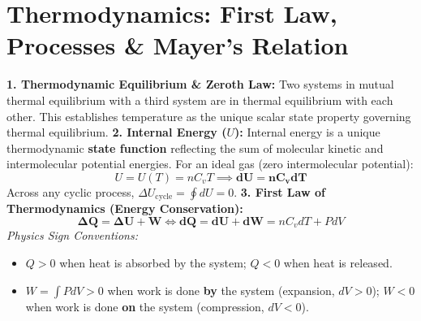 \documentclass[10pt,a4paper]{article}
\begin{document}
\section{Thermodynamics: First Law, Processes \& Mayer's Relation}

\begin{conceptbox}
\textbf{1. Thermodynamic Equilibrium \& Zeroth Law:}
Two systems in mutual thermal equilibrium with a third system are in thermal equilibrium with each other. This establishes temperature as the unique scalar state property governing thermal equilibrium.
\textbf{2. Internal Energy ($U$):}
Internal energy is a unique thermodynamic \textbf{state function} reflecting the sum of molecular kinetic and intermolecular potential energies. For an ideal gas (zero intermolecular potential):
\begin{equation}
  U = U(T) = n C_v T \implies \mathbf{dU = n C_v dT}
\end{equation}
Across any cyclic process, $\Delta U_{\text{cycle}} = \oint dU = 0$.
\textbf{3. First Law of Thermodynamics (Energy Conservation):}
\begin{equation}
  \mathbf{\Delta Q = \Delta U + W} \iff \mathbf{dQ = dU + dW} = n C_v dT + P dV
\end{equation}
\textit{Physics Sign Conventions:}
\begin{itemize}
  \item $Q > 0$ when heat is absorbed by the system; $Q < 0$ when heat is released.
  \item $W = \int P dV > 0$ when work is done \textbf{by} the system (expansion, $dV > 0$); $W < 0$ when work is done \textbf{on} the system (compression, $dV < 0$).
\end{itemize}
\end{conceptbox}
\end{document}
